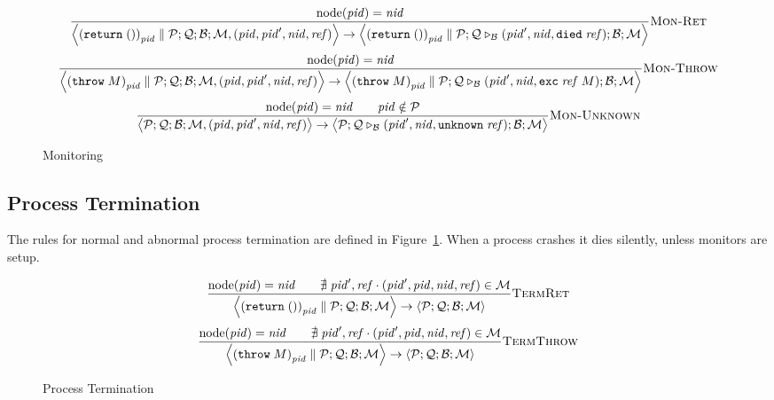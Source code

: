 \documentclass{article}
\newcommand{\sReturn}{\mathtt{return}}
\newcommand{\sThrow}[1]{\mathtt{throw} \; {#1}}
\DeclareMathOperator{\sNodeOf}{node}
\newcommand{\sExtend}[1]{\mathrel{\triangleright_{#1}}}
\newcommand{\sPar}{\mathrel{\parallel}}
\newcommand{\sNid}{\ensuremath{\mathit{nid}}}
\newcommand{\sPid}{\ensuremath{\mathit{pid}}}
\newcommand{\sRef}{\ensuremath{\mathit{ref}}}
\newcommand{\sSystem}[4]{\left\langle #1 ; #2 ; #3 ; #4 \right\rangle}
\newcommand{\sQueue}{\mathcal{Q}}
\newcommand{\sProcesses}{\mathcal{P}}
\newcommand{\sBlacklist}{\mathcal{B}}
\newcommand{\sMonitors}{\mathcal{M}}
\begin{document}
\begin{figure}
\begin{equation*}
\frac{
  \sNodeOf(\sPid) = \sNid
}{
  \sSystem{{(\sReturn \; ())}_\sPid \sPar \sProcesses}
          {\sQueue}
          {\sBlacklist}
          {\sMonitors, (\sPid, \sPid', \sNid, \sRef)}
\rightarrow
  \sSystem{{(\sReturn \; ())}_\sPid \sPar \sProcesses}
          {\sQueue \sExtend{\sBlacklist} (\sPid', \sNid, \mathtt{died} \; \sRef)}
          {\sBlacklist}
          {\sMonitors}
} \textsc{Mon-Ret}
\end{equation*}
%
\begin{equation*}
\frac{
  \sNodeOf(\sPid) = \sNid
}{
  \sSystem{{(\sThrow{M})}_\sPid \sPar \sProcesses}
          {\sQueue}
          {\sBlacklist}
          {\sMonitors, (\sPid, \sPid', \sNid, \sRef)}
\rightarrow
  \sSystem{{(\sThrow{M})}_\sPid \sPar \sProcesses}
          {\sQueue \sExtend{\sBlacklist} (\sPid', \sNid, \mathtt{exc} \; \sRef \; M)}
          {\sBlacklist}
          {\sMonitors}
} \textsc{Mon-Throw}
\end{equation*}
%
\begin{equation*}
\frac{
  \sNodeOf(\sPid) = \sNid
\qquad  
  \sPid \notin \sProcesses
}{
  \sSystem{\sProcesses}
          {\sQueue}
          {\sBlacklist}
          {\sMonitors, (\sPid, \sPid', \sNid, \sRef)}
\rightarrow
  \sSystem{\sProcesses}
          {\sQueue \sExtend{\sBlacklist} (\sPid', \sNid, \mathtt{unknown} \; \sRef)}
          {\sBlacklist}
          {\sMonitors}
} \textsc{Mon-Unknown}
\end{equation*}
%
\caption{Monitoring}
\end{figure}

\subsection{Process Termination}

The rules for normal and abnormal process termination are defined in
Figure~\ref{fig:termination}. When a process crashes it dies
silently, unless monitors are setup.  

\begin{figure}
\small
%
\begin{equation*}
\frac{
  \sNodeOf(\sPid) = \sNid
\qquad
  \nexists \; \sPid', \sRef \cdot (\sPid', \sPid, \sNid, \sRef) \in \sMonitors 
}{
  \sSystem{{(\sReturn \; ())}_\sPid \sPar \sProcesses}
          {\sQueue}
          {\sBlacklist}
          {\sMonitors}
\rightarrow          
  \sSystem{\sProcesses}
          {\sQueue}
          {\sBlacklist}
          {\sMonitors}
} \textsc{TermRet}
\end{equation*}
%
\begin{equation*}
\frac{
  \sNodeOf(\sPid) = \sNid
\qquad
  \nexists \; \sPid', \sRef \cdot (\sPid', \sPid, \sNid, \sRef) \in \sMonitors 
}{
  \sSystem{{(\sThrow{M})}_\sPid \sPar \sProcesses}
          {\sQueue}
          {\sBlacklist}
          {\sMonitors}
\rightarrow          
  \sSystem{\sProcesses}
          {\sQueue}
          {\sBlacklist}
          {\sMonitors}
} \textsc{TermThrow}
\end{equation*}
%
\caption{\label{fig:termination}Process Termination}
\end{figure}
\end{document}
